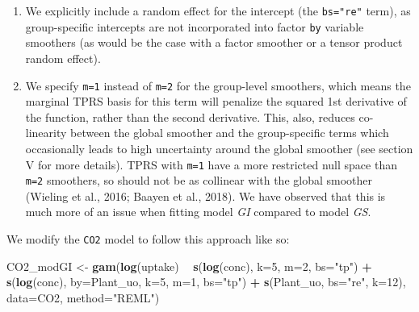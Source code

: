 \documentclass[12pt]{article}
\newenvironment{Shaded}{\begin{snugshade}}{\end{snugshade}}
\newcommand{\KeywordTok}[1]{\textcolor[rgb]{0.13,0.29,0.53}{\textbf{#1}}}
\newcommand{\DataTypeTok}[1]{\textcolor[rgb]{0.13,0.29,0.53}{#1}}
\newcommand{\DecValTok}[1]{\textcolor[rgb]{0.00,0.00,0.81}{#1}}
\newcommand{\StringTok}[1]{\textcolor[rgb]{0.31,0.60,0.02}{#1}}
\newcommand{\OperatorTok}[1]{\textcolor[rgb]{0.81,0.36,0.00}{\textbf{#1}}}
\newcommand{\NormalTok}[1]{#1}
\providecommand{\tightlist}{%
  \setlength{\itemsep}{0pt}\setlength{\parskip}{0pt}}
\begin{document}
\begin{enumerate}
\def\labelenumi{\arabic{enumi}.}
\tightlist
\item
  We explicitly include a random effect for the intercept (the
  \texttt{bs="re"} term), as group-specific intercepts are not
  incorporated into factor \texttt{by} variable smoothers (as would be
  the case with a factor smoother or a tensor product random effect).
\item
  We specify \texttt{m=1} instead of \texttt{m=2} for the group-level
  smoothers, which means the marginal TPRS basis for this term will
  penalize the squared 1st derivative of the function, rather than the
  second derivative. This, also, reduces co-linearity between the global
  smoother and the group-specific terms which occasionally leads to high
  uncertainty around the global smoother (see section V for more
  details). TPRS with \texttt{m=1} have a more restricted null space
  than \texttt{m=2} smoothers, so should not be as collinear with the
  global smoother (Wieling et al., 2016; Baayen et al., 2018). We have
  observed that this is much more of an issue when fitting model
  \emph{GI} compared to model \emph{GS}.
\end{enumerate}

We modify the \texttt{CO2} model to follow this approach like so:

\begin{Shaded}
\begin{Highlighting}[]
\NormalTok{CO2_modGI <-}\StringTok{ }\KeywordTok{gam}\NormalTok{(}\KeywordTok{log}\NormalTok{(uptake) }\OperatorTok{~}\StringTok{ }\KeywordTok{s}\NormalTok{(}\KeywordTok{log}\NormalTok{(conc), }\DataTypeTok{k=}\DecValTok{5}\NormalTok{, }\DataTypeTok{m=}\DecValTok{2}\NormalTok{, }\DataTypeTok{bs=}\StringTok{"tp"}\NormalTok{) }\OperatorTok{+}
\StringTok{                  }\KeywordTok{s}\NormalTok{(}\KeywordTok{log}\NormalTok{(conc), }\DataTypeTok{by=}\NormalTok{Plant_uo, }\DataTypeTok{k=}\DecValTok{5}\NormalTok{, }\DataTypeTok{m=}\DecValTok{1}\NormalTok{, }\DataTypeTok{bs=}\StringTok{"tp"}\NormalTok{) }\OperatorTok{+}
\StringTok{                  }\KeywordTok{s}\NormalTok{(Plant_uo, }\DataTypeTok{bs=}\StringTok{"re"}\NormalTok{, }\DataTypeTok{k=}\DecValTok{12}\NormalTok{),}
                \DataTypeTok{data=}\NormalTok{CO2, }\DataTypeTok{method=}\StringTok{"REML"}\NormalTok{)}
\end{Highlighting}
\end{Shaded}
\end{document}
